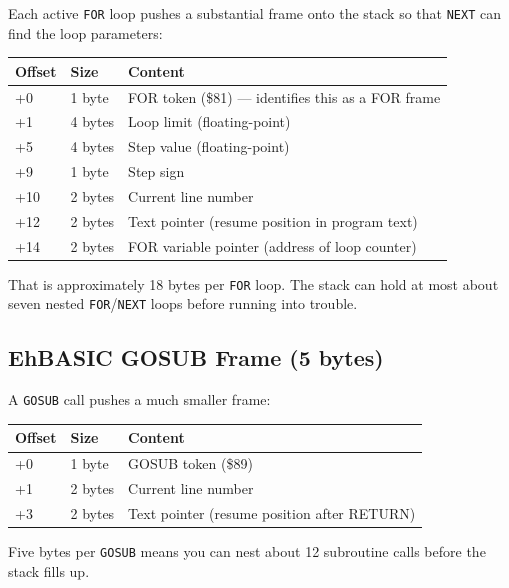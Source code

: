 Each active \texttt{FOR} loop pushes a substantial frame onto the stack so that
\texttt{NEXT} can find the loop parameters:

\begin{center}
\small
\begin{tabular}{@{}lll@{}}
\toprule
\textbf{Offset} & \textbf{Size} & \textbf{Content} \\
\midrule
+0  & 1 byte  & FOR token (\$81) --- identifies this as a FOR frame \\
+1  & 4 bytes & Loop limit (floating-point) \\
+5  & 4 bytes & Step value (floating-point) \\
+9  & 1 byte  & Step sign \\
+10 & 2 bytes & Current line number \\
+12 & 2 bytes & Text pointer (resume position in program text) \\
+14 & 2 bytes & FOR variable pointer (address of loop counter) \\
\bottomrule
\end{tabular}
\end{center}

That is approximately 18 bytes per \texttt{FOR} loop.  The stack can hold at
most about seven nested \texttt{FOR}/\texttt{NEXT} loops before running into
trouble.

\subsection{EhBASIC GOSUB Frame (5 bytes)}

A \texttt{GOSUB} call pushes a much smaller frame:

\begin{center}
\begin{tabular}{@{}lll@{}}
\toprule
\textbf{Offset} & \textbf{Size} & \textbf{Content} \\
\midrule
+0 & 1 byte  & GOSUB token (\$89) \\
+1 & 2 bytes & Current line number \\
+3 & 2 bytes & Text pointer (resume position after RETURN) \\
\bottomrule
\end{tabular}
\end{center}

Five bytes per \texttt{GOSUB} means you can nest about 12 subroutine calls
before the stack fills up.

